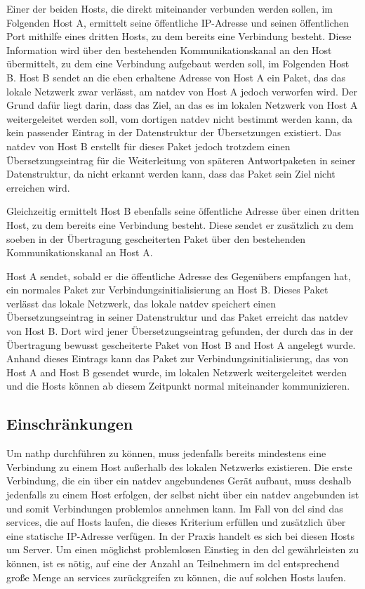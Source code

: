 Einer der beiden Hosts, die direkt miteinander verbunden werden sollen, im
Folgenden Host A,
ermittelt seine öffentliche IP-Adresse und seinen öffentlichen Port mithilfe
eines dritten Hosts, zu dem bereits eine Verbindung besteht.
Diese Information wird über den bestehenden Kommunikationskanal an den Host
übermittelt, zu dem eine Verbindung aufgebaut werden soll, im Folgenden Host B.
Host B sendet an die eben erhaltene Adresse von Host A ein Paket, das das lokale
Netzwerk zwar verlässt, am \gls{natdev} von Host A jedoch verworfen wird.
Der Grund dafür liegt darin, dass das Ziel, an das es im lokalen Netzwerk von
Host A weitergeleitet werden soll, vom dortigen \gls{natdev} nicht
bestimmt werden kann, da kein passender Eintrag in der Datenstruktur der
Übersetzungen existiert.
Das \gls{natdev} von Host B erstellt für dieses Paket jedoch trotzdem
einen Übersetzungseintrag für die Weiterleitung von späteren Antwortpaketen in
seiner Datenstruktur, da nicht erkannt werden kann, dass das Paket sein Ziel
nicht erreichen wird.

Gleichzeitig ermittelt Host B ebenfalls seine öffentliche Adresse über einen
dritten Host, zu dem bereits eine Verbindung besteht.
Diese sendet er zusätzlich zu dem soeben in der Übertragung gescheiterten Paket
über den bestehenden Kommunikationskanal an Host A.

Host A sendet, sobald er die öffentliche Adresse des Gegenübers empfangen hat,
ein normales Paket zur Verbindungsinitialisierung an Host B.
Dieses Paket verlässt das lokale Netzwerk, das lokale \gls{natdev} speichert
einen Übersetzungseintrag in seiner Datenstruktur und das Paket erreicht das
\gls{natdev} von Host B.
Dort wird jener Übersetzungseintrag gefunden, der durch das in der Übertragung
bewusst gescheiterte Paket von Host B and Host A angelegt wurde.
Anhand dieses Eintrags kann das Paket zur Verbindungsinitialisierung, das von
Host A and Host B gesendet wurde, im lokalen Netzwerk weitergeleitet werden und
die Hosts können ab diesem Zeitpunkt normal miteinander kommunizieren.

\subsection{Einschränkungen}
Um \gls{nathp} durchführen zu können, muss jedenfalls bereits mindestens eine
Verbindung zu einem Host außerhalb des lokalen Netzwerks existieren.
Die erste Verbindung, die ein über ein \gls{natdev} angebundenes Gerät aufbaut,
muss deshalb jedenfalls zu einem Host erfolgen, der selbst nicht über ein
\gls{natdev} angebunden ist und somit Verbindungen problemlos annehmen kann.
Im Fall von \gls{dcl} sind das \glspl{service}, die auf Hosts laufen, die dieses
Kriterium erfüllen und zusätzlich über eine statische IP-Adresse verfügen.
In der Praxis handelt es sich bei diesen Hosts um Server.
Um einen möglichst problemlosen Einstieg in den \gls{dcl} gewährleisten zu
können, ist es nötig, auf eine der Anzahl an Teilnehmern im \gls{dcl}
entsprechend große Menge an \glspl{service} zurückgreifen zu können, die auf
solchen Hosts laufen.
